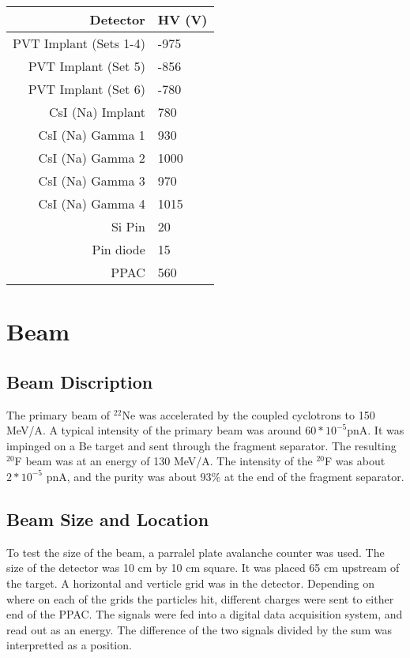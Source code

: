 \begin{center}
	\begin{tabular}{r|l}
	Detector & HV (V) \\ \hline
	PVT Implant (Sets 1-4) & -975 \\
	PVT Implant (Set 5) & -856 \\
	PVT Implant (Set 6) & -780 \\
	CsI (Na) Implant & 780 \\ 
	CsI (Na) Gamma 1 & 930 \\
	CsI (Na) Gamma 2 & 1000 \\
	CsI (Na) Gamma 3 & 970 \\
	CsI (Na) Gamma 4 & 1015 \\
	Si Pin & 20 \\
	Pin diode & 15 \\
	PPAC & 560 
	\label{tab:detvolt}
	\end{tabular}
\end{center}

\section{Beam}

\subsection{Beam Discription}
The primary beam of $^{22}$Ne was accelerated by the coupled cyclotrons to 150 MeV/A. 
A typical intensity of the primary beam was around $60 * 10^{-5}$pnA.
It was impinged on a Be target and sent through the fragment separator. 
The resulting $^{20}$F beam was at an energy of 130 MeV/A. 
The intensity of the $^{20}$F was about $2 * 10^{-5}$ pnA, and the purity was about $93\%$ at the end of the fragment separator.

\subsection{Beam Size and Location}
To test the size of the beam, a parralel plate avalanche counter was used.
The size of the detector was 10 cm by 10 cm square. 
It was placed 65 cm upstream of the target.
A horizontal and verticle grid was in the detector.
Depending on where on each of the grids the particles hit, different charges were sent to either end of the PPAC.
The signals were fed into a digital data acquisition system, and read out as an energy.
The difference of the two signals divided by the sum was interpretted as a position.

